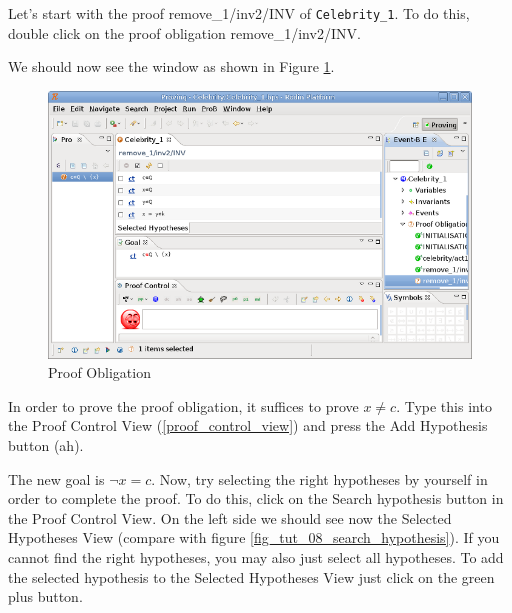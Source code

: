 Let's start with the proof \textsf{remove\_1/inv2/INV} of \texttt{Celebrity\_1}. To do this, double click on the proof obligation \textsf{remove\_1/inv2/INV}.


We should now see the window as shown in Figure \ref{fig_tut_08_proof_obligation}.

\begin{figure}[!h]
\begin{center}
	\includegraphics{img/tutorial/tut_08_proof2.png}
	\caption{Proof Obligation}
	\label{fig_tut_08_proof_obligation}
\end{center}
\end{figure}


In order to prove the proof obligation, it suffices to prove \textsf{$x \neq c$}. Type this into the \textsf{Proof Control View} (\ref{proof_control_view}) and press the \textsf{Add Hypothesis button (ah)}. 


The new goal is $\lnot x = c$. Now, try selecting the right hypotheses by yourself in order to complete the proof. To do this, click on the Search hypothesis button in the \textsf{Proof Control View}. On the left side we should see now the \textsf{Selected Hypotheses View} (compare with figure \ref{fig_tut_08_search_hypothesis}). If you cannot find the right hypotheses, you may also just select all hypotheses. To add the selected hypothesis to the \textsf{Selected Hypotheses View} just click on the green plus button. 

